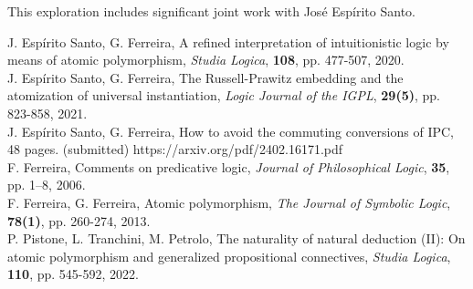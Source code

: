 \documentclass[a4paper]{article} %
\begin{document}
This exploration includes significant joint work with José Espírito Santo.


\begin{thebibliography}{}
	
J. Esp\'{i}rito Santo, G. Ferreira, A refined interpretation of intuitionistic logic by means of atomic polymorphism, \emph{Studia Logica}, \textbf{108}, pp. 477-507, 2020.\\

J. Esp\'{i}rito Santo, G. Ferreira, The Russell-Prawitz embedding and the atomization of universal instantiation, \emph{Logic Journal of the IGPL}, \textbf{29(5)}, pp. 823-858, 2021.\\

J. Esp\'{i}rito Santo, G. Ferreira, How to avoid the commuting conversions of IPC, 48 pages. (submitted) https://arxiv.org/pdf/2402.16171.pdf\\

        F. Ferreira, Comments on predicative logic, \emph{Journal of Philosophical Logic}, \textbf{35}, pp. 1--8, 2006.\\
  
F. Ferreira, G. Ferreira, Atomic polymorphism, \emph{The Journal of Symbolic Logic}, \textbf{78(1)}, pp. 260-274, 2013.\\

P. Pistone, L. Tranchini, M. Petrolo, The naturality of natural deduction (II): On atomic polymorphism and generalized propositional connectives, \emph{Studia Logica}, \textbf{110}, pp. 545-592, 2022. 

  \end{thebibliography}
\end{document}
